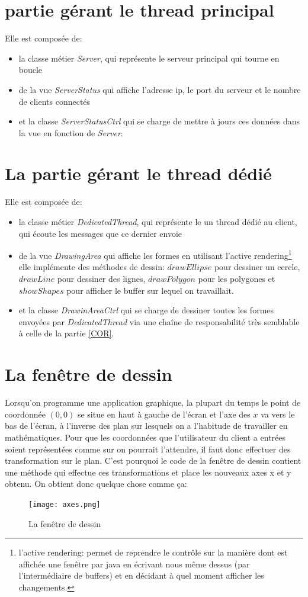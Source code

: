 \documentclass[10pt,a4paper]{report}
\begin{document}
\begin{spacing}{0.8}
\chapter{partie gérant le thread principal}
Elle est composée de:
\begin{itemize}
\item la classe métier \textit{Server}, qui représente le serveur principal qui tourne en boucle
\item de la vue \textit{ServerStatus} qui affiche l'adresse ip, le port du serveur et le nombre de clients connectés
\item et la classe \textit{ServerStatusCtrl} qui se charge de mettre à jours ces données dans la vue en fonction de \textit{Server}.
\end{itemize} 

\chapter{La partie gérant le thread dédié}
Elle est composée de:
\begin{itemize}
\item la classe métier \textit{DedicatedThread}, qui représente le un thread dédié au client, qui écoute les messages que ce dernier envoie
\item de la vue \textit{DrawingArea} qui affiche les formes en utilisant l'active rendering\footnote{l'active rendering: permet de reprendre le contrôle sur la manière dont est affichée une fenêtre par java en écrivant nous même dessus (par l'intermédiaire de buffers) et en décidant à quel moment afficher les changements.} elle implémente des méthodes de dessin: $drawEllipse$ pour dessiner un cercle, $drawLine$ pour dessiner des lignes, $drawPolygon$ pour les polygones et $showShapes$ pour afficher le buffer sur lequel on travaillait.
\item et la classe \textit{DrawinAreaCtrl} qui se charge de dessiner toutes les formes envoyées par \textit{DedicatedThread} via une chaîne de responsabilité très semblable à celle de la partie \ref{COR}.
\end{itemize}
\chapter{La fenêtre de dessin}
Lorsqu'on programme une application graphique, la plupart du temps le point de coordonnée $(0,0)$ se situe en haut à gauche de l'écran et l'axe des $x$ va vers le bas de l'écran, à l'inverse des plan sur lesquels on a l'habitude de travailler en mathématiques. Pour que les coordonnées que l'utilisateur du client a entrées soient représentées comme sur on pourrait l'attendre, il faut donc effectuer des transformation sur le plan. C'est pourquoi le code de la fenêtre de dessin contient une méthode qui effectue ces transformations et place les nouveaux axes x et y obtenu.
On obtient donc quelque chose comme ça:
\begin{figure}[H]
\texttt{[image: axes.png]}
\caption{La fenêtre de dessin}
\end{figure}


\end{spacing}
\end{document}
